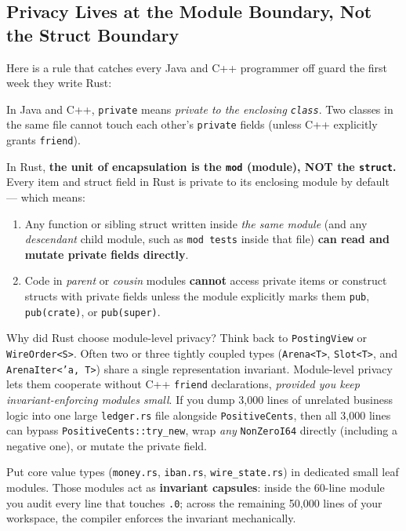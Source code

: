 \subsection{Privacy Lives at the Module Boundary, Not the Struct Boundary}

Here is a rule that catches every Java and C++ programmer off guard the first week they write Rust:

\begin{trapbox}
In Java and C++, \texttt{private} means \emph{private to the enclosing \texttt{class}}. Two classes in the same file cannot touch each other's \texttt{private} fields (unless C++ explicitly grants \texttt{friend}).

In Rust, \textbf{the unit of encapsulation is the \texttt{mod} (module), NOT the \texttt{struct}.} Every item and struct field in Rust is private to its enclosing module by default --- which means:
\begin{enumerate}
  \item Any function or sibling struct written inside \emph{the same module} (and any \emph{descendant} child module, such as \texttt{mod tests} inside that file) \textbf{can read and mutate private fields directly}.
  \item Code in \emph{parent} or \emph{cousin} modules \textbf{cannot} access private items or construct structs with private fields unless the module explicitly marks them \texttt{pub}, \texttt{pub(crate)}, or \texttt{pub(super)}.
\end{enumerate}
\end{trapbox}

Why did Rust choose module-level privacy? Think back to \texttt{PostingView} or \texttt{WireOrder<S>}. Often two or three tightly coupled types (\texttt{Arena<T>}, \texttt{Slot<T>}, and \texttt{ArenaIter<'a, T>}) share a single representation invariant. Module-level privacy lets them cooperate without C++ \texttt{friend} declarations, \emph{provided you keep invariant-enforcing modules small}. If you dump 3,000 lines of unrelated business logic into one large \texttt{ledger.rs} file alongside \texttt{PositiveCents}, then all 3,000 lines can bypass \texttt{PositiveCents::try\_new}, wrap \emph{any} \texttt{NonZeroI64} directly (including a negative one), or mutate the private field.

Put core value types (\texttt{money.rs}, \texttt{iban.rs}, \texttt{wire\_state.rs}) in dedicated small leaf modules. Those modules act as \textbf{invariant capsules}: inside the 60-line module you audit every line that touches \texttt{.0}; across the remaining 50,000 lines of your workspace, the compiler enforces the invariant mechanically.

